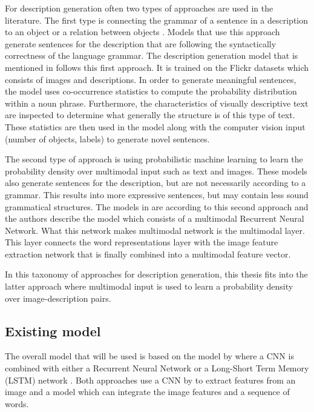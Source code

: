 For description generation often two types of approaches are used in the literature. The first type is connecting the grammar of a sentence in a description to an object or a relation between objects \cite{karpathyjoulin2014deep, Farhadi2010}. Models that use this approach generate sentences for the description that are following the syntactically correctness of the language grammar. The description generation model that is mentioned in \cite{mitchell2012midge} follows this first approach. It is trained on the Flickr datasets which consists of images and descriptions. In order to generate meaningful sentences, the model uses co-occurrence statistics to compute the probability distribution within a noun phrase. Furthermore, the characteristics of visually descriptive text are inspected to determine what generally the structure is of this type of text. These statistics are then used in the model along with the computer vision input (number of objects, labels) to generate novel sentences.

The second type of approach is using probabilistic machine learning to learn the probability density over multimodal input such as text and images. These models also generate sentences for the description, but are not necessarily according to a grammar. This results into more expressive sentences, but may contain less sound grammatical structures. The models in \cite{mao2014explain,karpathyfeifei2014deep,karpathyjoulin2014deep} are according to this second approach and the authors describe the model which consists of a multimodal Recurrent Neural Network. What this network makes multimodal network is the multimodal layer. This layer connects the word representations layer with the image feature extraction network that is finally combined into a multimodal feature vector. 

In this taxonomy of approaches for description generation, this thesis fits into the latter approach where multimodal input is used to learn a probability density over image-description pairs.

\subsection{Existing model}
The overall model that will be used is based on the model by \citeauthor{karpathyfeifei2014deep} where a CNN is combined with either a Recurrent Neural Network \cite{karpathyfeifei2014deep} or a Long-Short Term Memory (LSTM) network \cite{vinyals2014show}. Both approaches use a CNN by \citeauthor{simonyan2014very} \cite{simonyan2014very} to extract features from an image and a model which can integrate the image features and a sequence of words.  

